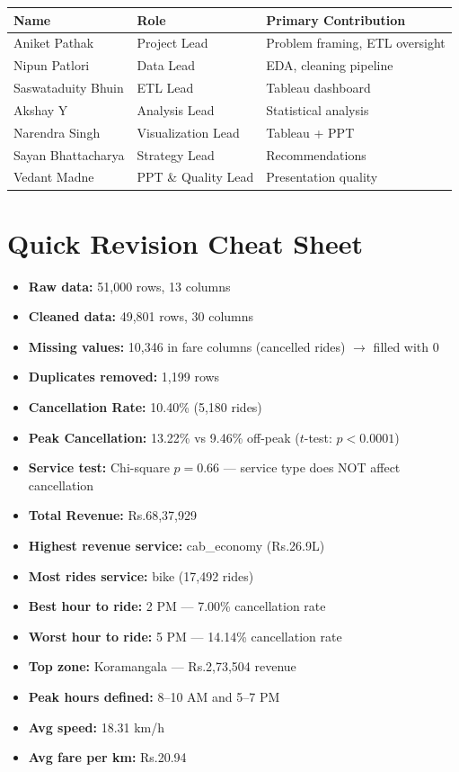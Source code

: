 \documentclass[12pt,a4paper]{article}
\begin{document}
\begin{center}
\begin{tabular}{lll}
\toprule
\textbf{Name} & \textbf{Role} & \textbf{Primary Contribution} \\
\midrule
Aniket Pathak & Project Lead & Problem framing, ETL oversight \\
Nipun Patlori & Data Lead & EDA, cleaning pipeline \\
Saswataduity Bhuin & ETL Lead & Tableau dashboard \\
Akshay Y & Analysis Lead & Statistical analysis \\
Narendra Singh & Visualization Lead & Tableau + PPT \\
Sayan Bhattacharya & Strategy Lead & Recommendations \\
Vedant Madne & PPT \& Quality Lead & Presentation quality \\
\bottomrule
\end{tabular}
\end{center}

\section{Quick Revision Cheat Sheet}

\begin{itemize}[leftmargin=*]
  \item \textbf{Raw data:} 51,000 rows, 13 columns
  \item \textbf{Cleaned data:} 49,801 rows, 30 columns
  \item \textbf{Missing values:} 10,346 in fare columns (cancelled rides) $\rightarrow$ filled with 0
  \item \textbf{Duplicates removed:} 1,199 rows
  \item \textbf{Cancellation Rate:} 10.40\% (5,180 rides)
  \item \textbf{Peak Cancellation:} 13.22\% vs 9.46\% off-peak ($t$-test: $p < 0.0001$)
  \item \textbf{Service test:} Chi-square $p = 0.66$ --- service type does NOT affect cancellation
  \item \textbf{Total Revenue:} Rs.68,37,929
  \item \textbf{Highest revenue service:} cab\_economy (Rs.26.9L)
  \item \textbf{Most rides service:} bike (17,492 rides)
  \item \textbf{Best hour to ride:} 2 PM --- 7.00\% cancellation rate
  \item \textbf{Worst hour to ride:} 5 PM --- 14.14\% cancellation rate
  \item \textbf{Top zone:} Koramangala --- Rs.2,73,504 revenue
  \item \textbf{Peak hours defined:} 8--10 AM and 5--7 PM
  \item \textbf{Avg speed:} 18.31 km/h
  \item \textbf{Avg fare per km:} Rs.20.94
\end{itemize}
\end{document}
